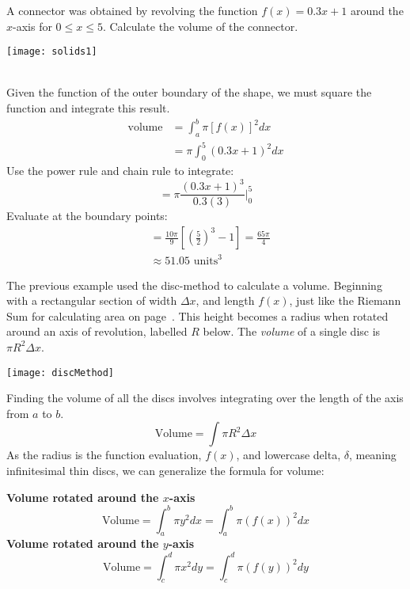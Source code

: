 \begin{multicols}{2}
	\example A connector was obtained by revolving the function $f(x)={0.3x+1}$ around the $x$-axis for $0\leq x \leq 5$. Calculate the volume of the connector.
\begin{center}\texttt{[image: solids1]}\end{center}
\columnbreak
\solution\\ Given the function of the outer boundary of the shape, we must square the function and integrate this result.\\
\begin{align*}
\mathrm{volume}&=\int_{a}^{b}\pi[f(x)]^2 dx\\
&=\pi\int_0^5\left(0.3x+1\right)^2 dx\end{align*}
Use the power rule and chain rule to integrate:\\
\[=\pi \frac{ (0.3x+1)^3}{0.3(3)} \Big|_0^5\]
Evaluate at the boundary points:\\
\begin{align*}
&=\frac{10\pi}{9}\left[\left(\frac{5}{2}\right)^3-1\right]=\frac{65\pi}{4}\\
&\approx 51.05 \text{ units}^3
\end{align*}
\end{multicols}

\clearpage
The previous example used the disc-method to calculate a volume. Beginning with a rectangular section of width $\Delta x$, and length $f(x)$, just like the Riemann Sum for calculating area on page~\pageref{fig:riemann}. This height becomes a radius when rotated around an axis of revolution, labelled $R$ below. The \textit{volume} of a single disc is $\pi R^2\Delta x$. 
\begin{center}\texttt{[image: discMethod]}\end{center}
Finding the volume of all the discs involves integrating over the length of the axis from $a$ to $b$.\[\text{Volume}=\int \pi R^2 \Delta x\] As the radius is the function evaluation, $f(x)$, and lowercase delta, $\delta$, meaning infinitesimal thin discs, we can generalize the formula for volume:
\begin{tcolorbox}
	\textbf{Volume rotated around the $x$-axis}
	\[ \text{Volume} = \int_{a}^{b} \pi y^2 dx = \int_{a}^{b} \pi (f(x))^2 dx\]
	\textbf{Volume rotated around the $y$-axis}
	\[ \text{Volume} = \int_{c}^{d} \pi x^2 dy =\int_{c}^{d} \pi (f(y))^2 dy  \]
\end{tcolorbox}


